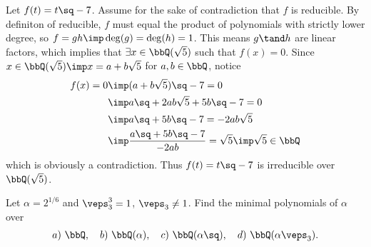 \documentclass{article}
\begin{document}
\begin{solution}
Let $ f(t) = t\sq - 7 $. Assume for the sake of contradiction that $ f $ is reducible. By definiton of reducible, $ f $ must equal the product of polynomials with strictly lower degree, so $ f=gh \imp \deg(g) = \deg(h) = 1 $. This means $ g\tand h $ are linear factors, which implies that $ \exists x\in \bbQ(\sqrt 5) $ such that $ f(x) = 0 $. Since $ x\in \bbQ(\sqrt 5) \imp x=a+b\sqrt 5$ for $ a,b\in \bbQ $, notice \begin{align*}
  f(x) = 0 &\imp (a+b\sqrt{5})\sq - 7 = 0 \\
  &\imp a\sq + 2ab\sqrt 5 + 5b\sq - 7 = 0 \\
  &\imp a\sq + 5b\sq - 7 = - 2ab\sqrt 5 \\
  &\imp \frac{a\sq + 5b\sq - 7}{-2ab} = \sqrt 5 \imp \sqrt 5\in \bbQ
\end{align*}
which is obviously a contradiction. Thus $ f(t) = t\sq - 7 $ is irreducible over $ \bbQ(\sqrt 5) $.
\end{solution}

\begin{subexercise}
Let $ \alpha=2^{1/6} $ and $ \veps_3^3=1 $, $ \veps_3\neq 1 $. Find the minimal polynomials of $ \alpha $ over \begin{align*}
  a)\ \bbQ, \quad b)\ \bbQ(\alpha), \quad c)\ \bbQ(\alpha\sq), \quad d)\ \bbQ(\alpha\veps_3).
\end{align*}
\end{subexercise}
\end{document}
